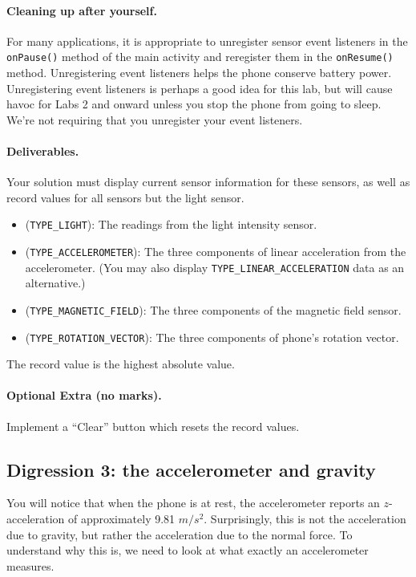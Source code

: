 \documentclass[10pt]{article}
\begin{document}
\paragraph{Cleaning up after yourself.} For many applications, it is appropriate to unregister
sensor event listeners in the {\tt onPause()} method of the main
activity and reregister them in the {\tt onResume()}
method. Unregistering event listeners helps the phone conserve battery
power. Unregistering event listeners is perhaps a good idea for this
lab, but will cause havoc for Labs 2 and onward unless you stop the
phone from going to sleep. We're not requiring that you unregister your event listeners.

\paragraph{Deliverables.} Your solution must display current sensor information for these sensors, as well as record values for all sensors but the light sensor.
\vspace*{-0.5em}

\begin{itemize}
\item ({\tt TYPE\_LIGHT}): The readings from the light intensity sensor. 
\item ({\tt TYPE\_ACCELEROMETER}): The three components of linear acceleration from the accelerometer. (You may also display {\tt TYPE\_LINEAR\_ACCELERATION} data as an alternative.)
\item ({\tt TYPE\_MAGNETIC\_FIELD}): The three components of the magnetic field sensor.
\item ({\tt TYPE\_ROTATION\_VECTOR}): The three components of phone's rotation vector. 
\end{itemize}
\vspace*{-0.5em}

The record value is the highest absolute value.

\paragraph{Optional Extra (no marks).} Implement a ``Clear'' button which resets the record values.

\subsection{Digression 3: the accelerometer and gravity}

You will notice that when the phone is at rest, the accelerometer reports an $z$-acceleration of approximately 9.81 $m/s^2$. Surprisingly, this is not the acceleration due to gravity, but rather the acceleration due to the normal force. To understand why this is, we need to look at what exactly an accelerometer measures.
\end{document}
